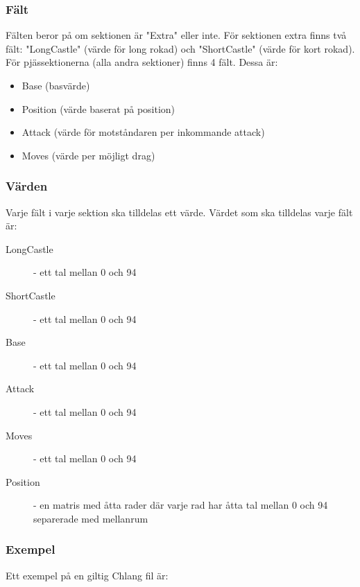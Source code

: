 \documentclass{article}
\begin{document}
	\subsubsection{Fält}
	Fälten beror på om sektionen är "Extra" eller inte.
	För sektionen extra finns två fält: "LongCastle" (värde för long rokad) och "ShortCastle" (värde för kort rokad). För pjässektionerna (alla andra sektioner) finns 4 fält. Dessa är:
\begin{itemize}
\item Base (basvärde)
\item Position (värde baserat på position)
\item Attack (värde för motståndaren per inkommande attack)
\item Moves (värde per möjligt drag)
\end{itemize}

\subsubsection{Värden}
Varje fält i varje sektion ska tilldelas ett värde. Värdet som ska tilldelas varje fält är:
\begin{description}
\item [LongCastle] - ett tal mellan 0 och 94
\item [ShortCastle] - ett tal mellan 0 och 94
\item [Base] - ett tal mellan 0 och 94
\item [Attack] - ett tal mellan 0 och 94 
\item [Moves] - ett tal mellan 0 och 94
\item [Position] - en matris med åtta rader där varje rad har åtta tal mellan 0 och 94 separerade med mellanrum
\end{description}

\subsubsection{Exempel}
Ett exempel på en giltig Chlang fil är:
\end{document}
